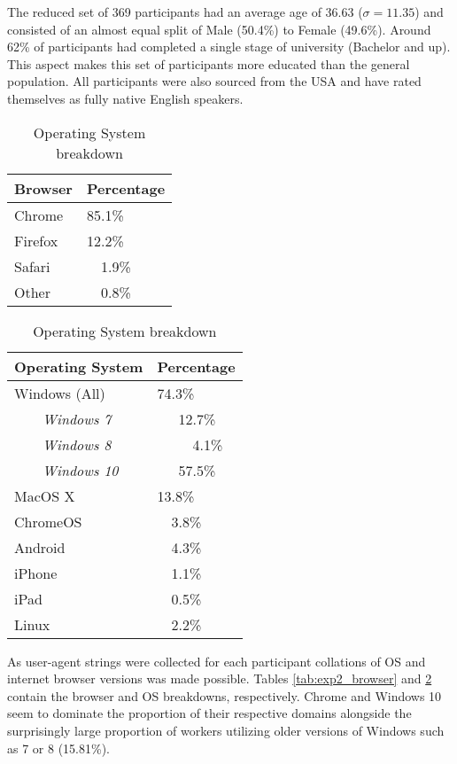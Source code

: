 The reduced set of 369 participants had an average age of 36.63 ($\sigma = 11.35$) and consisted of an almost equal split of Male (50.4\%) to Female (49.6\%). Around 62\% of participants had completed a single stage of university (Bachelor and up). This aspect makes this set of participants more educated than the general population. All participants were also sourced from the USA and have rated themselves as fully native English speakers.
\begin{table}[!h]
    \centering
    \begin{tabular}{|l|l|}
        \hline
        Browser & Percentage \\
        \hline
        Chrome & 85.1\% \\
        Firefox & 12.2\% \\
        Safari & ~~1.9\% \\
        Other & ~~0.8\% \\
        \hline
    \end{tabular}
    \caption{Internet Browser breakdown}
    \label{tab:exp2_browser}
    \begin{tabular}{|l|l|}
        \hline
        Operating System & Percentage \\
        \hline
        
        \hline
        Windows (All) & 74.3\% \\
        ~~~~\textit{Windows 7} & ~~~12.7\% \\
        ~~~~\textit{Windows 8} & ~~~~~4.1\% \\
        ~~~~\textit{Windows 10} & ~~~57.5\% \\
        MacOS X	 & 13.8\% \\
        ChromeOS & ~~3.8\% \\
        Android	& ~~4.3\% \\
        iPhone	& ~~1.1\% \\
        iPad	& ~~0.5\% \\
        Linux	& ~~2.2\% \\
        \hline
    \end{tabular}
    \caption{Operating System breakdown}
    \label{tab:exp2_os}
\end{table}
    
As user-agent strings were collected for each participant collations of OS and internet browser versions was made possible. Tables \ref{tab:exp2_browser} and \ref{tab:exp2_os} contain the browser and OS breakdowns,  respectively. Chrome and Windows 10 seem to dominate the proportion of their respective domains alongside the surprisingly large proportion of workers utilizing older versions of Windows such as 7 or 8 (15.81\%).

